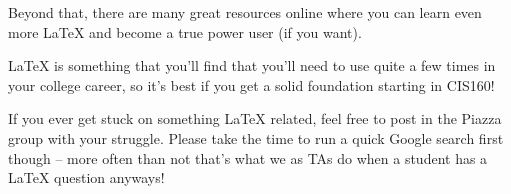 \documentclass{article}
\begin{document}
Beyond that, there are many great resources online where you can learn even
more \LaTeX{} and become a true power user (if you want).

\LaTeX{} is something that you'll find that
you'll need to use quite a few times in your college career, so it's best if you
get a solid foundation starting in CIS160!

If you ever get stuck on something \LaTeX{} \@ related, feel free to post in the Piazza
group with your struggle. Please take the time to run a quick Google search first
though -- more often than not that's what we as TAs do when a student has a \LaTeX{} \@
question anyways!
\end{document}
